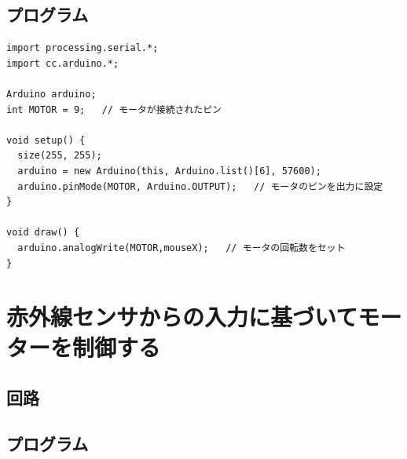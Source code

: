 \documentclass[11pt,a4paper]{jarticle}
\begin{document}
\subsection*{プログラム}
\begin{lstlisting}
import processing.serial.*;
import cc.arduino.*;
 
Arduino arduino;
int MOTOR = 9;   // モータが接続されたピン
 
void setup() {
  size(255, 255);
  arduino = new Arduino(this, Arduino.list()[6], 57600);
  arduino.pinMode(MOTOR, Arduino.OUTPUT);   // モータのピンを出力に設定
}
 
void draw() {
  arduino.analogWrite(MOTOR,mouseX);   // モータの回転数をセット
}
\end{lstlisting}


\section{赤外線センサからの入力に基づいてモーターを制御する}

\subsection*{回路}

\subsection*{プログラム}
\begin{lstlisting}
 
\end{lstlisting}
\end{document}
